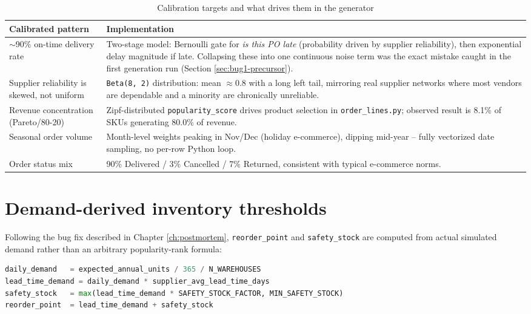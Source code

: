 \documentclass[11pt,a4paper]{report}
\begin{document}
\begin{table}[H]
\centering
\caption{Calibration targets and what drives them in the generator}
\begin{tabular}{p{5.2cm}p{7.8cm}}
\toprule
\textbf{Calibrated pattern} & \textbf{Implementation} \\
\midrule
$\sim$90\% on-time delivery rate &
  Two-stage model: Bernoulli gate for \emph{is this PO late} (probability
  driven by supplier reliability), then exponential delay magnitude if
  late. Collapsing these into one continuous noise term was the exact
  mistake caught in the first generation run (Section \ref{sec:bug1-precursor}). \\
Supplier reliability is skewed, not uniform &
  \texttt{Beta(8, 2)} distribution: mean $\approx 0.8$ with a long left
  tail, mirroring real supplier networks where most vendors are dependable
  and a minority are chronically unreliable. \\
Revenue concentration (Pareto/80-20) &
  Zipf-distributed \texttt{popularity\_score} drives product selection in
  \texttt{order\_lines.py}; observed result is 8.1\% of SKUs generating
  80.0\% of revenue. \\
Seasonal order volume &
  Month-level weights peaking in Nov/Dec (holiday e-commerce), dipping
  mid-year -- fully vectorized date sampling, no per-row Python loop. \\
Order status mix &
  90\% Delivered / 3\% Cancelled / 7\% Returned, consistent with typical
  e-commerce norms. \\
\bottomrule
\end{tabular}
\end{table}

\section{Demand-derived inventory thresholds}

Following the bug fix described in Chapter \ref{ch:postmortem},
\texttt{reorder\_point} and \texttt{safety\_stock} are computed from actual
simulated demand rather than an arbitrary popularity-rank formula:

\begin{lstlisting}[language=Python, caption=Demand-derived stock thresholds (src/data\_generation/products.py)]
daily_demand   = expected_annual_units / 365 / N_WAREHOUSES
lead_time_demand = daily_demand * supplier_avg_lead_time_days
safety_stock   = max(lead_time_demand * SAFETY_STOCK_FACTOR, MIN_SAFETY_STOCK)
reorder_point  = lead_time_demand + safety_stock
\end{lstlisting}
\end{document}
